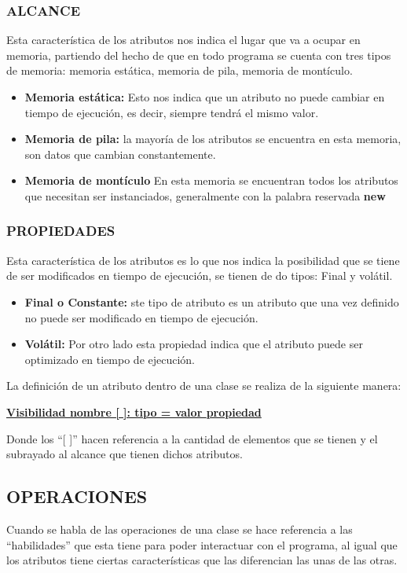 \subsubsection{ALCANCE}
Esta característica de los atributos nos indica el lugar que va a ocupar en memoria, partiendo del hecho de que en todo programa se cuenta con tres tipos de memoria: memoria estática, memoria de pila, memoria de montículo.

\begin{itemize}
	\item{\textbf{Memoria estática:} Esto nos indica que un atributo no puede cambiar en tiempo de ejecución, es decir, siempre tendrá el mismo valor.}
	\item{\textbf{Memoria de pila:} la mayoría de los atributos se encuentra en esta memoria, son datos que cambian constantemente.}
	\item{\textbf{Memoria de montículo} En esta memoria se encuentran todos los atributos que necesitan ser instanciados, generalmente con la palabra reservada \textbf{new}}
	
\end{itemize}

\subsubsection{PROPIEDADES}
Esta característica de los atributos es lo que nos indica la posibilidad que se tiene de ser modificados en tiempo de ejecución, se tienen de do tipos: Final y volátil.

\begin{itemize}
	\item{\textbf{Final o Constante:} ste tipo de atributo es un atributo que una vez definido no puede ser modificado en tiempo de ejecución.}
	\item{\textbf{Volátil:} Por otro lado esta propiedad indica que el atributo puede ser optimizado en tiempo de ejecución.}
\end{itemize}

La definición de un atributo dentro de una clase se realiza de la siguiente manera:

\centerline{\textbf{\underline{Visibilidad nombre [ ]: tipo = valor {propiedad}}}}
Donde los “[ ]” hacen referencia a la cantidad de elementos que se tienen y el subrayado al alcance que tienen dichos atributos.



\subsection{OPERACIONES}
Cuando se habla de las operaciones de una clase se hace referencia a las “habilidades” que esta tiene para poder interactuar con el programa, al igual que los atributos tiene ciertas características que las diferencian las unas de las otras.


